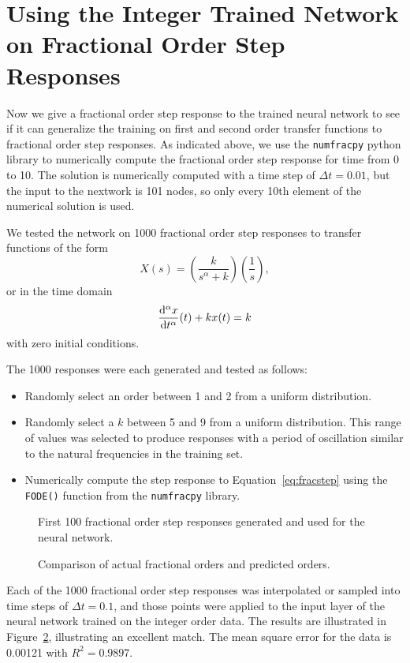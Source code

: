 \section{Using the Integer Trained Network on Fractional Order Step Responses}

Now we give a fractional order step response to the trained neural network to
see if it can generalize the training on first and second order transfer
functions to fractional order step responses. As indicated above, we use the
\texttt{numfracpy} python library to numerically compute the fractional order
step response for time from 0 to 10. The solution is numerically computed with a
time step of $\Delta t = 0.01$, but the input to the nextwork is 101 nodes, so
only every 10th element of the numerical solution is used.

We tested the network on 1000 fractional order step responses to transfer
functions of the form
\[
  X(s) = \left( \frac{k}{s^\alpha + k} \right) \left( \frac{1}{s} \right),
\]
or in the time domain
\begin{equation}
\frac{\mathrm{d}^\alpha x}{\mathrm{d} t^\alpha}(t) + k x(t) = k
\label{eq:fracstep}
\end{equation}
with zero initial conditions. 

The 1000 responses were each generated and tested as follows: 
\begin{itemize}
\item Randomly select an order between 1 and 2 from a uniform distribution.
\item Randomly select a $k$ between 5 and 9 from a uniform distribution. This
  range of values was selected to produce responses with a period of oscillation
  similar to the natural frequencies in the training set.
\item Numerically compute the step response to Equation~\ref{eq:fracstep} using
the \texttt{FODE()} function from the \texttt{numfracpy} library. 
\end{itemize}

\begin{figure}
\centering

\vspace*{-5pt}
\caption{First 100 fractional order step responses generated and used for the
neural network.}
\label{fig:accuracy}
\end{figure}


\begin{figure}
\centering

\vspace*{-5pt}
\caption{Comparison of actual fractional orders and predicted orders.}
\label{fig:accuracy}
\end{figure}

Each of the 1000 fractional order step responses was interpolated or sampled
into time steps of $\Delta t = 0.1$, and those points were applied to the input
layer of the neural network trained on the integer order data. The results are
illustrated in Figure~\ref{fig:accuracy}, illustrating an excellent match. The
mean square error for the data is 0.00121 with $R^2 = 0.9897$. 

